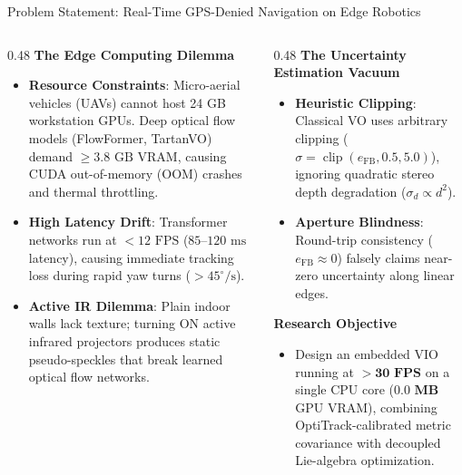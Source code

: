 \documentclass[aspectratio=169, 10pt]{beamer}
\begin{document}
\begin{frame}{Problem Statement: Real-Time GPS-Denied Navigation on Edge Robotics}
  \begin{columns}[T]
    \begin{column}{0.48\textwidth}
      {\small \textbf{\textcolor{NavyBlue}{The Edge Computing Dilemma}}}
      \vspace{0.1cm}
      \scriptsize
      \begin{itemize}
        \setlength{\itemsep}{2.5pt}
        \item \textbf{Resource Constraints}: Micro-aerial vehicles (UAVs) cannot host 24 GB workstation GPUs. Deep optical flow models (FlowFormer, TartanVO) demand $\ge 3.8\text{ GB}$ VRAM, causing CUDA out-of-memory (OOM) crashes and thermal throttling.
        \item \textbf{High Latency Drift}: Transformer networks run at $< 12\text{ FPS}$ ($85\text{--}120\text{ ms}$ latency), causing immediate tracking loss during rapid yaw turns ($> 45^\circ/\text{s}$).
        \item \textbf{Active IR Dilemma}: Plain indoor walls lack texture; turning ON active infrared projectors produces static pseudo-speckles that break learned optical flow networks.
      \end{itemize}
    \end{column}

    \begin{column}{0.48\textwidth}
      {\small \textbf{\textcolor{NavyBlue}{The Uncertainty Estimation Vacuum}}}
      \vspace{0.1cm}
      \scriptsize
      \begin{itemize}
        \setlength{\itemsep}{2.5pt}
        \item \textbf{Heuristic Clipping}: Classical VO uses arbitrary clipping ($\sigma = \operatorname{clip}(e_{\text{FB}}, 0.5, 5.0)$), ignoring quadratic stereo depth degradation ($\sigma_d \propto d^2$).
        \item \textbf{Aperture Blindness}: Round-trip consistency ($e_{\text{FB}} \approx 0$) falsely claims near-zero uncertainty along linear edges.
      \end{itemize}
      \vspace{0.15cm}

      {\small \textbf{\textcolor{EmeraldGreen}{Research Objective}}}\\
      \scriptsize
      \begin{itemize}
        \setlength{\itemsep}{2pt}
        \item Design an embedded VIO running at $\mathbf{> 30\text{ FPS}}$ on a single CPU core ($\mathbf{0.0\text{ MB}}$ GPU VRAM), combining OptiTrack-calibrated metric covariance with decoupled Lie-algebra optimization.
      \end{itemize}
    \end{column}
  \end{columns}
\end{frame}
\end{document}
